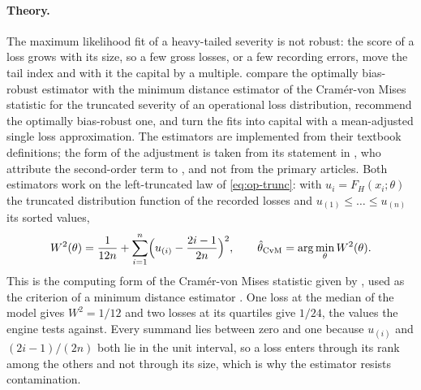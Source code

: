 \paragraph{Theory.} The maximum likelihood fit of a heavy-tailed severity is not robust: the score of a loss grows with its size, so a
few gross losses, or a few recording errors, move the tail index and with it the capital by a multiple. \citet{oprisk:opdyke2012}
compare the optimally bias-robust estimator with the minimum distance estimator of the Cram\'er-von Mises statistic for the truncated
severity of an operational loss distribution, recommend the optimally bias-robust one, and turn the fits into capital with a mean-adjusted
single loss approximation. The estimators are implemented from their textbook definitions; the form of the adjustment is taken from its
statement in \citet{oprisk:peters2016}, who attribute the second-order term to \citet{oprisk:degen2010}, and not from the primary articles. Both estimators work on the left-truncated law of \cref{eq:op-trunc}: with $u_i=F_H(x_i;\theta)$ the truncated
distribution function of the recorded losses and $u_{(1)}\le\dots\le u_{(n)}$ its sorted values,
\begin{equation}
W^2(\theta)=\frac{1}{12n}+\sum_{i=1}^{n}\Bigl(u_{(i)}-\frac{2i-1}{2n}\Bigr)^2,\qquad
\hat\theta_{\mathrm{CvM}}=\arg\min_{\theta}W^2(\theta).
\label{eq:op-cvm}
\end{equation}
This is the computing form of the Cram\'er-von Mises statistic given by \citet{oprisk:anderson1952}, used as the criterion of a minimum
distance estimator \citep{oprisk:wolfowitz1957}. One loss at the median of the model gives $W^2=1/12$ and two losses at its
quartiles give $1/24$, the values the engine tests against. Every summand lies between zero and one because $u_{(i)}$ and $(2i-1)/(2n)$ both lie in
the unit interval, so a loss enters through its rank among the others and not through its size, which is why the estimator resists contamination.

